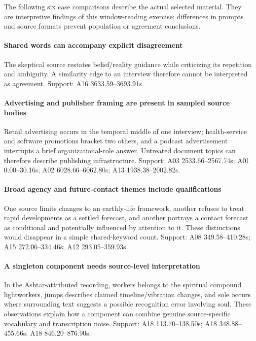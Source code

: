 The following six case comparisons describe the actual selected material. They are interpretive findings of this window-reading exercise; differences in prompts and source formats prevent population or agreement conclusions.

\paragraph{Shared words can accompany explicit disagreement} The skeptical source restates belief/reality guidance while criticizing its repetition and ambiguity. A similarity edge to an interview therefore cannot be interpreted as agreement. Support: A16 3633.59--3693.91s.

\paragraph{Advertising and publisher framing are present in sampled source bodies} Retail advertising occurs in the temporal middle of one interview; health-service and software promotions bracket two others, and a podcast advertisement interrupts a brief organizational-role answer. Untreated document topics can therefore describe publishing infrastructure. Support: A03 2533.66--2567.74s; A01 0.00--30.16s; A02 6028.66--6062.80s; A13 1938.38--2002.82s.

\paragraph{Broad agency and future-contact themes include qualifications} One source limits changes to an earthly-life framework, another refuses to treat rapid developments as a settled forecast, and another portrays a contact forecast as conditional and potentially influenced by attention to it. These distinctions would disappear in a simple shared-keyword count. Support: A08 349.58--410.28s; A15 272.06--334.46s; A12 293.05--359.93s.

\paragraph{A singleton component needs source-level interpretation} In the Ashtar-attributed recording, workers belongs to the spiritual compound lightworkers, jumps describes claimed timeline/vibration changes, and sole occurs where surrounding text suggests a possible recognition error involving soul. These observations explain how a component can combine genuine source-specific vocabulary and transcription noise. Support: A18 113.70--138.50s; A18 348.88--455.66s; A18 846.20--876.90s.

